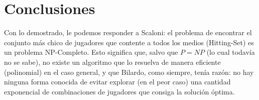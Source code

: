 \section{Conclusiones}

Con lo demostrado, le podemos responder a Scaloni: el problema de encontrar el conjunto más chico de jugadores que
contente a todos los medios (Hitting-Set) es un problema NP-Completo. Esto significa que, salvo que $P = NP$ (lo cual todavía no se sabe), no existe un
algoritmo que lo resuelva de manera eficiente (polinomial) en el caso general, y que Bilardo, como siempre, tenía razón:
no hay ninguna forma conocida de evitar explorar (en el peor caso) una cantidad exponencial de combinaciones de jugadores
que consiga la solución óptima.

